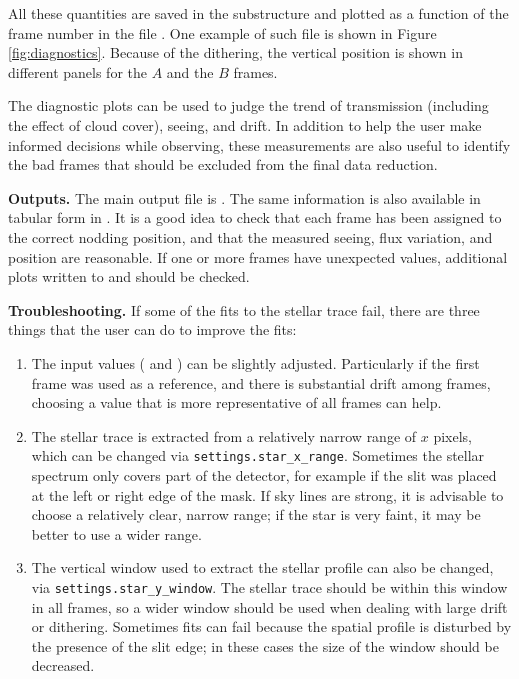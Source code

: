 \documentclass[a4paper]{article}
\begin{document}
\begin{sloppypar}
All these quantities are saved in the substructure  and plotted as a function of the frame number in the file . One example of such file is shown in Figure \ref{fig:diagnostics}. Because of the dithering, the vertical position is shown in different panels for the $A$ and the $B$ frames.

The diagnostic plots can be used to judge the trend of transmission (including the effect of cloud cover), seeing, and drift. In addition to help the user make informed decisions while observing, these measurements are also useful to identify the bad frames that should be excluded from the final data reduction.

\medskip
\noindent
\textbf{Outputs.} The main output file is . The same information is also available in tabular form in . It is a good idea to check that each frame has been assigned to the correct nodding position, and that the measured seeing, flux variation, and position are reasonable. If one or more frames have unexpected values, additional plots written to  and  should be checked.

\medskip
\noindent
\textbf{Troubleshooting.} If some of the fits to the stellar trace fail, there are three things that the user can do to improve the fits:
\begin{enumerate}
\item The input values ( and ) can be slightly adjusted. Particularly if the first frame was used as a reference, and there is substantial drift among frames, choosing a value that is more representative of all frames can help.
\item The stellar trace is extracted from a relatively narrow range of $x$ pixels, which can be changed via \texttt{settings.star\_x\_range}. Sometimes the stellar spectrum only covers part of the detector, for example if the slit was placed at the left or right edge of the mask. If sky lines are strong, it is advisable to choose a relatively clear, narrow range; if the star is very faint, it may be better to use a wider range.
\item The vertical window used to extract the stellar profile can also be changed, via \texttt{settings.star\_y\_window}. The stellar trace should be within this window in all frames, so a wider window should be used when dealing with large drift or dithering. Sometimes fits can fail because the spatial profile is disturbed by the presence of the slit edge; in these cases the size of the window should be decreased.
\end{enumerate}



\end{sloppypar}
\end{document}
